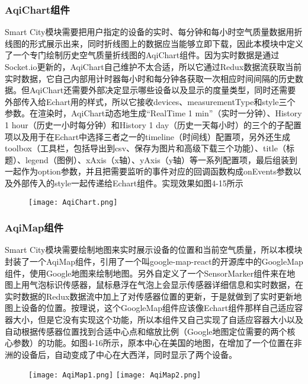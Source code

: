 \subsubsection{AqiChart组件}
Smart City模块需要把用户指定的设备的实时、每分钟和每小时空气质量数据用折线图的形式展示出来，同时折线图上的数据应当能够立即下载，因此本模块中定义了一个专门绘制历史空气质量折线图的AqiChart组件。因为实时数据是通过Socket.io更新的，AqiChart自己维护不太合适，所以它通过Redux数据流获取当前实时数据，它自己内部用计时器每小时和每分钟各获取一次相应时间间隔的历史数据。但AqiChart还需要外部决定显示哪些设备以及显示的度量类型，同时还需要外部传入给Echart用的样式，所以它接收devices、measurementType和style三个参数。在渲染时，AqiChart动态地生成“RealTime 1 min”（实时一分钟）、History 1 hour（历史一小时每分钟）和History 1 day（历史一天每小时）的三个的子配置项以及用于在Echart中选择三者之一的timeline（时间线）配置项，另外还生成toolbox（工具栏，包括导出到csv、保存为图片和高级下载三个功能）、title（标题）、legend（图例）、xAxis（x轴）、yAxis（y轴）等一系列配置项，最后组装到一起作为option参数，并且把需要监听的事件对应的回调函数构成onEvents参数以及外部传入的style一起传递给Echart组件。实现效果如图4-15所示
\begin{figure}[!htp]
 \centering
 \texttt{[image: AqiChart.png]}
\end{figure}
\subsubsection{AqiMap组件}
Smart City模块需要绘制地图来实时展示设备的位置和当前空气质量，所以本模块封装了一个AqiMap组件，引用了一个叫google-map-react的开源库中的GoogleMap组件，使用Google地图来绘制地图。另外自定义了一个SensorMarker组件来在地图上用气泡标识传感器，鼠标悬浮在气泡上会显示传感器详细信息和实时数据，在实时数据的Redux数据流中加上了对传感器位置的更新，于是就做到了实时更新地图上设备的位置。按理说，这个GoogleMap组件应该像Echart组件那样自己适应容器大小，但是它没有实现这个功能，所以本组件又自己实现了自适应容器大小以及自动根据传感器位置找到合适中心点和缩放比例（Google地图定位需要的两个核心参数）的功能。如图4-16所示，原本中心在美国的地图，在增加了一个位置在非洲的设备后，自动变成了中心在大西洋，同时显示了两个设备。
\begin{figure}[!htp]
 \centering
 \texttt{[image: AqiMap1.png]}
 \texttt{[image: AqiMap2.png]}
\end{figure}
